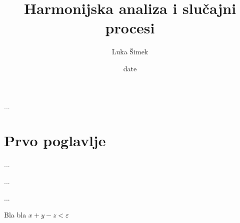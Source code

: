 \documentclass[a4paper,twoside,12pt]{memoir}
\title{Harmonijska analiza i slu\v{c}ajni procesi}
\author{Luka Šimek}
\date{date}
\begin{document}
\frontmatter

\begin{intro}
	...
\end{intro}

\chapter{Prvo poglavlje}
...

\printbibliography
\pagestyle{empty}

\begin{sazetak}
	...
\end{sazetak}

\begin{summary}
	...
\end{summary}

\begin{cv}
	Bla bla \(x + y - z < \varepsilon \)
\end{cv}
\end{document}
